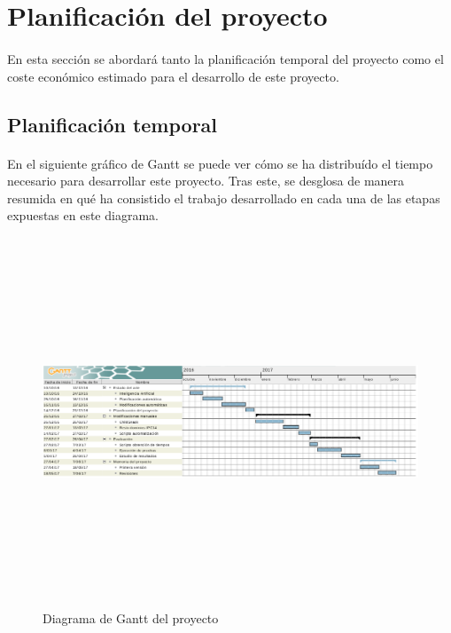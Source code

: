 \documentclass{article}
\author{Adrián Gil Moral }
\begin{document}
\section{Planificación del proyecto}
\paragraph{}
En esta sección se abordará tanto la planificación temporal del proyecto como el coste económico estimado para el desarrollo de este proyecto.

\subsection{Planificación temporal}
\paragraph{}
En el siguiente gráfico de Gantt se puede ver cómo se ha distribuído el tiempo necesario para desarrollar este proyecto. Tras este, se desglosa de manera resumida en qué ha consistido el trabajo desarrollado en cada una de las etapas expuestas en este diagrama.

\begin{landscape}
\thispagestyle{empty}
\begin{figure}[H]
    
    \includegraphics[width=20cm, height=11cm]{diagramaGantt}
    \caption{Diagrama de Gantt del proyecto}
\end{figure}
\end{landscape}
\end{document}
